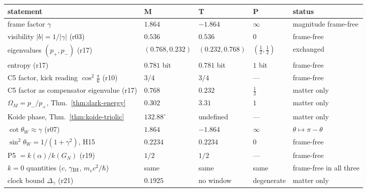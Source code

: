 \begin{center}
\footnotesize
\begin{tabular}{@{}>{\raggedright\arraybackslash}p{}>{\raggedright\arraybackslash}p{}>{\raggedright\arraybackslash}p{}>{\raggedright\arraybackslash}p{}>{\raggedright\arraybackslash}p{}@{}}
\toprule
statement & M & T & P & status\\
\midrule
frame factor \(\gamma\) & \(1.864\) & \(-1.864\) & \(\infty\) & magnitude frame-free\\
visibility \(|b|=1/|\gamma|\) (r03) & \(0.536\) & \(0.536\) & \(0\) & frame-free\\
eigenvalues \((p_+,p_-)\) (r17) & \((0.768,0.232)\) & \((0.232,0.768)\) & \((\tfrac12,\tfrac12)\) & exchanged\\
entropy (r17) & \(0.781\) bit & \(0.781\) bit & \(1\) bit & frame-free\\
C5 factor, kick reading \(\cos^2\frac\pi6\) (r10) & \(3/4\) & \(3/4\) & --- & frame-free\\
C5 factor as compensator eigenvalue (r17) & \(0.768\) & \(0.232\) & \(\tfrac12\) & matter only\\
\(\Omega_M=p_-/p_+\), Thm.~\ref{thm:dark-energy} & \(0.302\) & \(3.31\) & \(1\) & matter only\\
Koide phase, Thm.~\ref{thm:koide-triolic} & \(132.88^\circ\) & undefined & --- & matter only\\
\(\cot\theta_W\approx\gamma\) (r07) & \(1.864\) & \(-1.864\) & \(\infty\) & \(\theta\mapsto\pi-\theta\)\\
\(\sin^2\theta_W=1/(1+\gamma^2)\), H15 & \(0.2234\) & \(0.2234\) & \(0\) & frame-free\\
P5 \(=k(\alpha)/k(G_N)\) (r19) & \(1/2\) & \(1/2\) & --- & frame-free\\
\(k=0\) quantities (\(c\), \(\gamma_{\mathrm{BI}}\), \(m_ec^2/\hbar\)) & same & same & same & frame-free in all three\\
clock bound \(\Delta_\gamma\) (r21) & \(0.1925\) & no window & degenerate & matter only\\
\bottomrule
\end{tabular}
\end{center}

